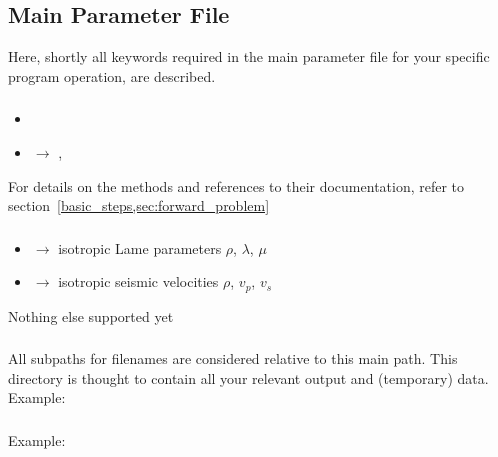 \subsection{Main Parameter File} \label{files,sec:main_parfile}
%
Here, shortly all keywords required in the main parameter file for your specific program operation, are described.
\subsubsection{} \label{files,sec:main_parfile,itm:forward_method}
\begin{itemize}
\item[] 
\item[]  $\rightarrow$  , 
\end{itemize}
For details on the methods and references to their documentation, refer to section~\ref{basic_steps,sec:forward_problem}
\subsubsection{} \label{files,sec:main_parfile,itm:mod_pmtrz}
\begin{itemize}
\item[]  $\rightarrow$ isotropic Lam\´e parameters $\rho$, $\lambda$, $\mu$
\item[]  $\rightarrow$ isotropic seismic velocities $\rho$, $v_p$, $v_s$
\end{itemize}
Nothing else supported yet
\subsubsection{} \label{files,sec:main_parfile,itm:main_path}
All subpaths for filenames are considered relative to this main path. This
directory is thought to contain all your relevant output and (temporary) data.\\
Example: 
\subsubsection{} \label{files,sec:main_parfile,itm:cur_iter_step}
Example: 
